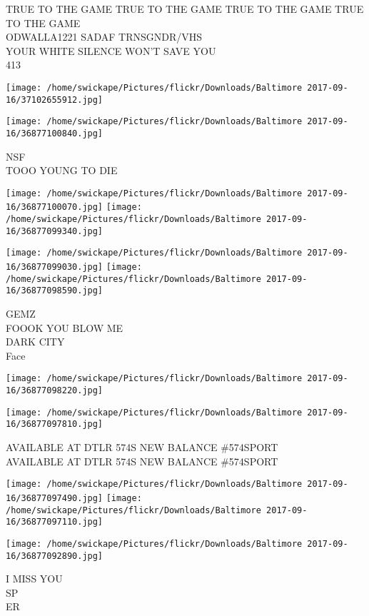 \documentclass[10pt,letterpaper]{article}
\begin{document}
TRUE TO THE GAME TRUE TO THE GAME TRUE TO THE GAME TRUE TO THE GAME\\
ODWALLA1221 SADAF TRNSGNDR/VHS\\
YOUR WHITE SILENCE WON'T SAVE YOU\\
413
\pagebreak

\texttt{[image: /home/swickape/Pictures/flickr/Downloads/Baltimore 2017-09-16/37102655912.jpg]}

\vspace{0.25in}
\texttt{[image: /home/swickape/Pictures/flickr/Downloads/Baltimore 2017-09-16/36877100840.jpg]}

NSF\\
TOOO YOUNG TO DIE
\pagebreak

\texttt{[image: /home/swickape/Pictures/flickr/Downloads/Baltimore 2017-09-16/36877100070.jpg]}
\texttt{[image: /home/swickape/Pictures/flickr/Downloads/Baltimore 2017-09-16/36877099340.jpg]}

\texttt{[image: /home/swickape/Pictures/flickr/Downloads/Baltimore 2017-09-16/36877099030.jpg]}
\texttt{[image: /home/swickape/Pictures/flickr/Downloads/Baltimore 2017-09-16/36877098590.jpg]}

GEMZ\\
FOOOK YOU BLOW ME\\
DARK CITY\\
Face
\pagebreak

\texttt{[image: /home/swickape/Pictures/flickr/Downloads/Baltimore 2017-09-16/36877098220.jpg]}

\vspace{0.25in}
\texttt{[image: /home/swickape/Pictures/flickr/Downloads/Baltimore 2017-09-16/36877097810.jpg]}

AVAILABLE AT DTLR 574S NEW BALANCE \#574SPORT\\
AVAILABLE AT DTLR 574S NEW BALANCE \#574SPORT
\pagebreak

\texttt{[image: /home/swickape/Pictures/flickr/Downloads/Baltimore 2017-09-16/36877097490.jpg]}
\texttt{[image: /home/swickape/Pictures/flickr/Downloads/Baltimore 2017-09-16/36877097110.jpg]}

\texttt{[image: /home/swickape/Pictures/flickr/Downloads/Baltimore 2017-09-16/36877092890.jpg]}

I MISS YOU\\
SP\\
ER
\pagebreak
\end{document}
